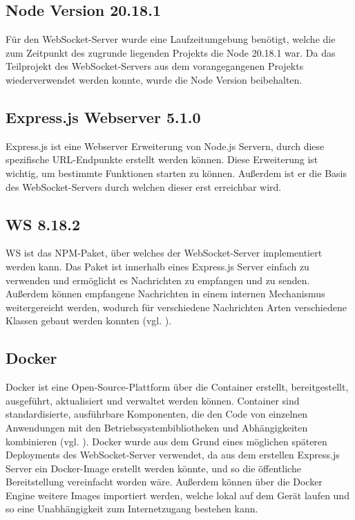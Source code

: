 \subsection{Node Version 20.18.1}
Für den WebSocket-Server wurde eine Laufzeitumgebung benötigt, welche die zum Zeitpunkt des zugrunde liegenden Projekts die Node 20.18.1 war. Da das Teilprojekt des WebSocket-Servers aus dem vorangegangenen Projekts wiederverwendet werden konnte, wurde die Node Version beibehalten.

\subsection{Express.js Webserver 5.1.0}
Express.js ist eine Webserver Erweiterung von Node.js Servern, durch diese spezifische \ac{URL}-Endpunkte erstellt werden können. Diese Erweiterung ist wichtig, um bestimmte Funktionen starten zu können. Außerdem ist er die Basis des WebSocket-Servers durch welchen dieser erst erreichbar wird.

\subsection{WS 8.18.2}
WS ist das \ac{NPM}-Paket, über welches der WebSocket-Server implementiert werden kann. Das Paket ist innerhalb eines Express.js Server einfach zu verwenden und ermöglicht es Nachrichten zu empfangen und zu senden. Außerdem können empfangene Nachrichten in einem internen Mechanismus weitergereicht werden, wodurch für verschiedene Nachrichten Arten verschiedene Klassen gebaut werden konnten (vgl. \cite{websockets_websocketsws_2025}).

\subsection{Docker}
Docker ist eine Open-Source-Plattform über die Container erstellt, bereitgestellt, ausgeführt, aktualisiert und verwaltet werden können. Container sind standardisierte, ausführbare Komponenten, die den Code von einzelnen Anwendungen mit den Betriebssystembibliotheken und Abhängigkeiten kombinieren (vgl. \cite{noauthor_was_2024}). Docker wurde aus dem Grund eines möglichen späteren Deployments des WebSocket-Server verwendet, da aus dem erstellen Express.js Server ein Docker-Image erstellt werden könnte, und so die öffentliche Bereitstellung vereinfacht worden wäre. Außerdem können über die Docker Engine weitere Images importiert werden, welche lokal auf dem Gerät laufen und so eine Unabhängigkeit zum Internetzugang bestehen kann.

